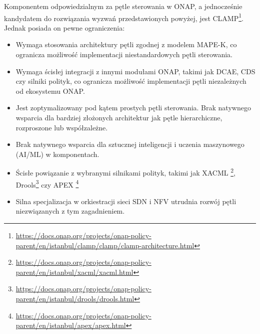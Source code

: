 Komponentem odpowiedzialnym za pętle sterowania w ONAP, a jednocześnie kandydatem do rozwiązania wyzwań przedstawionych powyżej, jest CLAMP\footnote{\url{https://docs.onap.org/projects/onap-policy-parent/en/istanbul/clamp/clamp/clamp-architecture.html}}. Jednak posiada on pewne ograniczenia:
\begin{itemize}
    \item Wymaga stosowania architektury pętli zgodnej z modelem MAPE-K, co ogranicza możliwość implementacji niestandardowych pętli sterowania.
    \item Wymaga ścisłej integracji z innymi modułami ONAP, takimi jak DCAE, CDS czy silniki polityk, co ogranicza możliwość implementacji pętli niezależnych od ekosystemu ONAP.
    \item Jest zoptymalizowany pod kątem prostych pętli sterowania. Brak natywnego wsparcia dla bardziej złożonych architektur jak pętle hierarchiczne, rozproszone lub współzależne.
    \item Brak natywnego wsparcia dla sztucznej inteligencji i uczenia maszynowego (AI/ML) w komponentach.
    \item Ścisłe powiązanie z wybranymi silnikami polityk, takimi jak XACML \footnote{\url{https://docs.onap.org/projects/onap-policy-parent/en/istanbul/xacml/xacml.html}}, Drools\footnote{\url{https://docs.onap.org/projects/onap-policy-parent/en/istanbul/drools/drools.html}} czy APEX \footnote{\url{https://docs.onap.org/projects/onap-policy-parent/en/istanbul/apex/apex.html}} 
    \item Silna specjalizacja w orkiestracji sieci SDN i NFV utrudnia rozwój pętli niezwiązanych z tym zagadnieniem.
\end{itemize}





